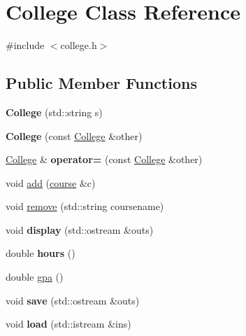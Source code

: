 \hypertarget{classCollege}{}\section{College Class Reference}
\label{classCollege}


{\ttfamily \#include $<$college.\+h$>$}

\subsection*{Public Member Functions}
\begin{DoxyCompactItemize}
\item 
{\bfseries College} (std\+::string s)\hypertarget{classCollege_adabaf4087355e83f9f7d39f1e1498b41}{}\label{classCollege_adabaf4087355e83f9f7d39f1e1498b41}

\item 
{\bfseries College} (const \hyperlink{classCollege}{College} \&other)\hypertarget{classCollege_ad007ad488e5a7ef986114080d0c8e101}{}\label{classCollege_ad007ad488e5a7ef986114080d0c8e101}

\item 
\hyperlink{classCollege}{College} \& {\bfseries operator=} (const \hyperlink{classCollege}{College} \&other)\hypertarget{classCollege_af2194c9b37f80d13dc3fdba6784b18e8}{}\label{classCollege_af2194c9b37f80d13dc3fdba6784b18e8}

\item 
void \hyperlink{classCollege_a67fd1d8970b46b24ce2e0dd72598a22f}{add} (\hyperlink{classcourse}{course} \&c)
\item 
void \hyperlink{classCollege_a4d2ae513b36e6421fb1ca2c08459cfe6}{remove} (std\+::string coursename)
\item 
void {\bfseries display} (std\+::ostream \&outs)\hypertarget{classCollege_a52ca0a164483cf5c05591cd0fb8b300c}{}\label{classCollege_a52ca0a164483cf5c05591cd0fb8b300c}

\item 
double {\bfseries hours} ()\hypertarget{classCollege_a8a7a762611a1d7e00c453390d49355fd}{}\label{classCollege_a8a7a762611a1d7e00c453390d49355fd}

\item 
double \hyperlink{classCollege_aaf9bfaa0bc717e96da6365661a96fcd0}{gpa} ()
\item 
void {\bfseries save} (std\+::ostream \&outs)\hypertarget{classCollege_af6b419f813bc990c0e11f99b78a26899}{}\label{classCollege_af6b419f813bc990c0e11f99b78a26899}

\item 
void {\bfseries load} (std\+::istream \&ins)\hypertarget{classCollege_a11422094ddd907705daede7aa537dd73}{}\label{classCollege_a11422094ddd907705daede7aa537dd73}

\end{DoxyCompactItemize}


